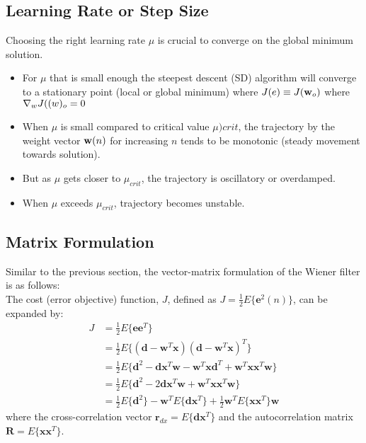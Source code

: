 \subsection{Learning Rate or Step Size}
Choosing the right learning rate $\mu$ is crucial to converge on the global minimum solution.
\begin{itemize}
    \item For $\mu$ that is small enough the steepest descent (SD) algorithm will converge to a stationary point (local or global minimum) where $J(e) \equiv J(\mathbf{w}_o)$ where $\nabla_wJ(\mathbf(w)_o = 0$
    \item When $\mu$ is small compared to critical value $\mu){crit}$, the trajectory by the weight vector $\mathbf{w}(n)$ for increasing $n$ tends to be monotonic (steady movement towards solution). 
    \item But as $\mu$ gets closer to $\mu_{crit}$, the trajectory is oscillatory or overdamped. 
    \item When $\mu$ exceeds $\mu_{crit}$, trajectory becomes unstable.
\end{itemize}



\subsection{Matrix Formulation}
Similar to the previous section, the vector-matrix formulation of the Wiener filter is as follows:\\


The cost (error objective) function, \( J \), defined as \( J = \frac{1}{2} E\{\mathbf{e}^2(n)\} \), can be expanded by:
\begin{align}
J &= \frac{1}{2} E\{ \mathbf{e} \mathbf{e}^T \} \nonumber \\
  &= \frac{1}{2} E\{ (\mathbf{d} - \mathbf{w}^T \mathbf{x})(\mathbf{d} - \mathbf{w}^T \mathbf{x})^T \} \nonumber \\
  &= \frac{1}{2} E\{ \mathbf{d}^2 - \mathbf{d}\mathbf{x}^T \mathbf{w} - \mathbf{w}^T \mathbf{x}\mathbf{d}^T + \mathbf{w}^T \mathbf{x}\mathbf{x}^T \mathbf{w} \} \nonumber \\
  &= \frac{1}{2} E\{ \mathbf{d}^2 - 2\mathbf{d}\mathbf{x}^T \mathbf{w} + \mathbf{w}^T \mathbf{x}\mathbf{x}^T \mathbf{w} \} \nonumber \\
  &= \frac{1}{2} E\{ \mathbf{d}^2 \} - \mathbf{w}^T E\{ \mathbf{d}\mathbf{x}^T \} + \frac{1}{2} \mathbf{w}^T E\{ \mathbf{x}\mathbf{x}^T \} \mathbf{w}
\end{align}
where the cross-correlation vector \( \mathbf{r}_{dx} = E\{ \mathbf{d}\mathbf{x}^T \} \) and the autocorrelation matrix \( \mathbf{R} = E\{ \mathbf{x}\mathbf{x}^T \} \).

